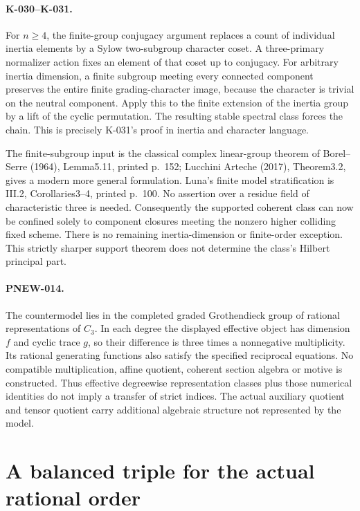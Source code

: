\paragraph{K-030--K-031.}
For $n\ge4$, the finite-group conjugacy argument replaces a count of individual
inertia elements by a Sylow two-subgroup character coset. A three-primary
normalizer action fixes an element of that coset up to conjugacy.
For arbitrary inertia dimension, a finite subgroup meeting every
connected component preserves the entire finite grading-character image,
because the character is trivial on the neutral component. Apply this
to the finite extension of the inertia group by a lift of the cyclic
permutation. The resulting stable spectral class forces the chain.
This is precisely K-031's proof in inertia and character language.

The finite-subgroup input is the classical complex linear-group theorem
of Borel--Serre (1964), Lemma5.11, printed p.~152; Lucchini Arteche
(2017), Theorem3.2, gives a modern more general formulation. Luna's
finite model stratification is III.2, Corollaries3--4, printed p.~100.
No assertion over a residue field of characteristic three is needed.
Consequently the supported coherent class can now be confined solely
to component closures meeting the nonzero higher colliding fixed scheme.
There is no remaining inertia-dimension or finite-order exception.
This strictly sharper support theorem does not determine the class's
Hilbert principal part.

\paragraph{PNEW-014.}
The countermodel lies in the completed graded Grothendieck group of
rational representations of $C_3$. In each degree the displayed
effective object has dimension $f$ and cyclic trace $g$, so their
difference is three times a nonnegative multiplicity. Its rational
generating functions also satisfy the specified reciprocal equations.
No compatible multiplication, affine quotient, coherent section algebra
or motive is constructed. Thus effective degreewise representation
classes plus those numerical identities do not imply a transfer of
strict indices. The actual auxiliary quotient and tensor quotient carry
additional algebraic structure not represented by the model.

\section{A balanced triple for the actual rational order}
